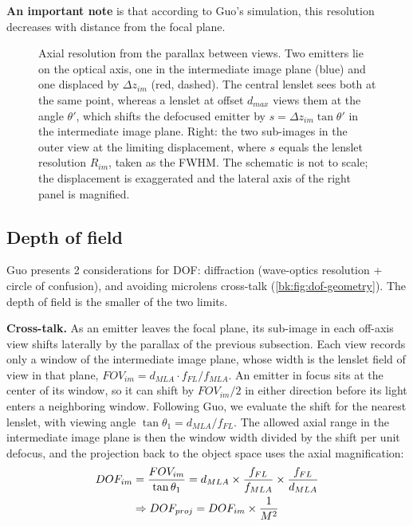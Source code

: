\textbf{An important note} is that according to Guo's simulation, this resolution decreases with distance from the focal plane.

\begin{figure}[tbp]
    \centering
    \resizebox{\textwidth}{!}{}
    \caption{Axial resolution from the parallax between views. Two emitters lie on the optical axis, one in the intermediate image plane (blue) and one displaced by $\Delta z_{im}$ (red, dashed). The central lenslet sees both at the same point, whereas a lenslet at offset $d_{max}$ views them at the angle $\theta'$, which shifts the defocused emitter by $s=\Delta z_{im}\tan\theta'$ in the intermediate image plane. Right: the two sub-images in the outer view at the limiting displacement, where $s$ equals the lenslet resolution $R_{im}$, taken as the FWHM. The schematic is not to scale; the displacement is exaggerated and the lateral axis of the right panel is magnified.}
    \label{bk:fig:axial-parallax}
\end{figure}

\subsection{Depth of field}
\label{bk:subsec:depth-of-field}
Guo presents 2 considerations for DOF: diffraction (wave-optics resolution + circle of confusion), and avoiding microlens cross-talk (\cref{bk:fig:dof-geometry}). The depth of field is the smaller of the two limits.

\textbf{Cross-talk.} As an emitter leaves the focal plane, its sub-image in each off-axis view shifts laterally by the parallax of the previous subsection. Each view records only a window of the intermediate image plane, whose width is the lenslet field of view in that plane, $FOV_{im}=d_{MLA}\cdot f_{FL}/f_{MLA}$. An emitter in focus sits at the center of its window, so it can shift by $FOV_{im}/2$ in either direction before its light enters a neighboring window. Following Guo, we evaluate the shift for the nearest lenslet, with viewing angle $\tan\theta_1 = d_{MLA}/f_{FL}$. The allowed axial range in the intermediate image plane is then the window width divided by the shift per unit defocus, and the projection back to the object space uses the axial magnification:
\begin{gather}
    DOF_{im} = \frac{FOV_{im}}{\tan\theta_1} = d_{MLA}\times \frac{f_{FL}}{f_{MLA}}\times \frac{f_{FL}}{d_{MLA}} \\
    \Rightarrow DOF_{proj} = DOF_{im}\times \frac{1}{M^2} \notag
\end{gather}

